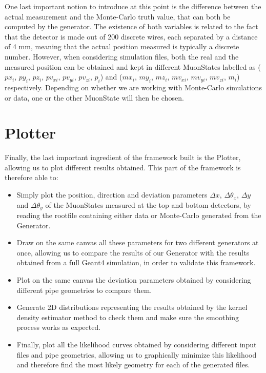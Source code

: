 \documentclass[a4paper, 11pt, twoside, openright]{report}
\begin{document}
One last important notion to introduce at this point is the difference between the actual measurement and the Monte-Carlo truth value, that can both be computed by the generator. The existence of both variables is related to the fact that the detector is made out of 200 discrete wires, each separated by a distance of 4 mm, meaning that the actual position measured is typically a discrete number. However, when considering simulation files, both the real and the measured position can be obtained and kept in different MuonStates labelled as ($px_i$, $py_i$, $pz_i$, $pv_{xi}$, $pv_{yi}$, $pv_{zi}$, $p_i$) and ($mx_i$, $my_i$, $mz_i$, $mv_{xi}$, $mv_{yi}$, $mv_{zi}$, $m_i$) respectively. Depending on whether we are working with Monte-Carlo simulations or data, one or the other MuonState will then be chosen.

\section{Plotter} \label{sec:Plotter}

Finally, the last important ingredient of the framework built is the Plotter, allowing us to plot different results obtained. This part of the framework is therefore able to:

\begin{itemize}
    \item Simply plot the position, direction and deviation parameters $\Delta x$, $\Delta \theta_x$, $\Delta y$ and $\Delta \theta_y$ of the MuonStates measured at the top and bottom detectors, by reading the rootfile containing either data or Monte-Carlo generated from the Generator.
    \item Draw on the same canvas all these parameters for two different generators at once, allowing us to compare the results of our Generator with the results obtained from a full Geant4 simulation, in order to validate this framework.
    \item Plot on the same canvas the deviation parameters obtained by considering different pipe geometries to compare them.
    \item Generate 2D distributions representing the results obtained by the kernel density estimator method to check them and make sure the smoothing process works as expected.
    \item Finally, plot all the likelihood curves obtained by considering different input files and pipe geometries, allowing us to graphically minimize this likelihood and therefore find the most likely geometry for each of the generated files.
\end{itemize}
\end{document}
